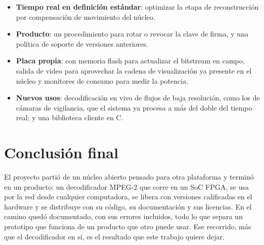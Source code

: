 \begin{itemize}
  \item \textbf{Tiempo real en definición estándar}: optimizar la etapa de
    reconstrucción por compensación de movimiento del núcleo.
  \item \textbf{Producto}: un procedimiento para rotar o revocar la clave de
    firma, y una política de soporte de versiones anteriores.
  \item \textbf{Placa propia}: con memoria flash para actualizar el bitstream
    en campo, salida de video para aprovechar la cadena de visualización ya
    presente en el núcleo y monitores de consumo para medir la potencia.
  \item \textbf{Nuevos usos}: decodificación en vivo de flujos de baja
    resolución, como los de cámaras de vigilancia, que el sistema ya procesa
    a más del doble del tiempo real; y una biblioteca cliente en C.
\end{itemize}

\section{Conclusión final}

El proyecto partió de un núcleo abierto pensado para otra plataforma y
terminó en un producto: un decodificador MPEG-2 que corre en un SoC FPGA,
se usa por la red desde cualquier computadora, se libera con versiones
calificadas en el hardware y se distribuye con su código, su documentación y
sus licencias. En el camino quedó documentado, con sus errores incluidos,
todo lo que separa un prototipo que funciona de un producto que otro puede
usar. Ese recorrido, más que el decodificador en sí, es el resultado que este
trabajo quiere dejar.
